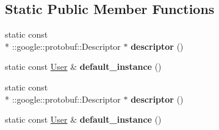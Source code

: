 \subsection*{Static Public Member Functions}
\begin{DoxyCompactItemize}
\item 
\hypertarget{classSimpleChat_1_1User_a56f56187e04d8b7b4731712769255af2}{static const \\*
\-::google\-::protobuf\-::\-Descriptor $\ast$ {\bfseries descriptor} ()}\label{classSimpleChat_1_1User_a56f56187e04d8b7b4731712769255af2}

\item 
\hypertarget{classSimpleChat_1_1User_ae3104aea0a851e8ce14d98f2302c1453}{static const \hyperlink{classSimpleChat_1_1User}{User} \& {\bfseries default\-\_\-instance} ()}\label{classSimpleChat_1_1User_ae3104aea0a851e8ce14d98f2302c1453}

\item 
\hypertarget{classSimpleChat_1_1User_a56f56187e04d8b7b4731712769255af2}{static const \\*
\-::google\-::protobuf\-::\-Descriptor $\ast$ {\bfseries descriptor} ()}\label{classSimpleChat_1_1User_a56f56187e04d8b7b4731712769255af2}

\item 
\hypertarget{classSimpleChat_1_1User_ae3104aea0a851e8ce14d98f2302c1453}{static const \hyperlink{classSimpleChat_1_1User}{User} \& {\bfseries default\-\_\-instance} ()}\label{classSimpleChat_1_1User_ae3104aea0a851e8ce14d98f2302c1453}

\end{DoxyCompactItemize}

